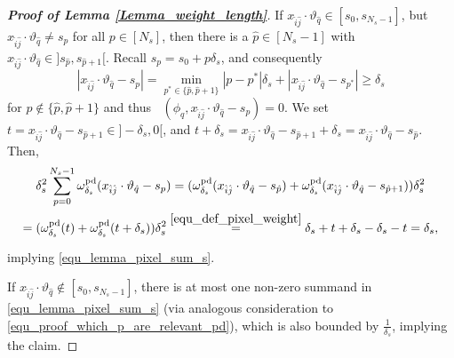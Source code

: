 \documentclass[10pt,a4paper]{amsart}
\DeclareMathOperator{\PixelWeight}{\omega^\mathrm{pd}_{\delta_\mathit{s}}}
\newcommand{\sums}{\sum_{p=0}^{N_s-1}}
\begin{document}
\begin{proof}[\textbf{Proof of Lemma \ref{Lemma_weight_length}}]
If $x_{\hat i \hat j}\cdot\vartheta_{\hat q}\in [s_0,s_{N_s-1}]$, but $x_{\hat i \hat j}\cdot\vartheta_{\hat q}\neq s_p$ for all $p\in [N_s]$, then there is a $\hat p\in [N_s-1]$ with $x_{\hat i \hat j}\cdot\vartheta_{\hat q}\in ]s_{\hat p},s_{\hat p+1}[$. Recall $s_p=s_0+p \delta_s$, and consequently 
\begin{equation} \label{equ_proof_which_p_are_relevant_pd}
|x_{\hat i \hat j}\cdot\vartheta_{\hat q}-s_p|= \min_{p^* \in \{\hat p,\hat p +1\}} |p-p^*|\delta_s+|x_{\hat i \hat j}\cdot\vartheta_{\hat q}-s_{p^*}|\geq \delta_s
\end{equation}
for $p\not \in \{\hat p,\hat p+1\}$ and thus $\PixelWeight(\phi_q,x_{\hat i \hat j}\cdot \vartheta_{\hat q}-s_p)=0$. 
We set $t = x_{\hat i \hat j}\cdot \vartheta_{\hat q}-s_{\hat p+1} \in ]-\delta_s,0[$, and $t+\delta_s = x_{\hat i \hat j}\cdot \vartheta_{\hat q}-s_{\hat p+1} +\delta_s= x_{\hat i \hat j}\cdot \vartheta_{\hat q}-s_{\hat p}$. 
Then, 
\begin{multline}
 \delta_s^2 \sums \PixelWeight(x_{\hat i \hat j}\cdot \vartheta_{\hat q} -s_p)=(\PixelWeight(x_{\hat i \hat j}\cdot \vartheta_{\hat q} -s_{\hat p})+\PixelWeight(x_{\hat i \hat j}\cdot \vartheta_{\hat q} -s_{\hat p+1}))\delta_s^2
\\
 = (\PixelWeight(t)+\PixelWeight(t+\delta_s))\delta_s^2 \underset{\text{}}{\overset{\eqref{equ_def_pixel_weight}}{=}} \delta_s +t + \delta_s - \delta_s-t = \delta_s,
\end{multline} implying \eqref{equ_lemma_pixel_sum_s}.

If $x_{\hat i \hat j}\cdot\vartheta_{\hat q} \not \in [s_0,s_{N_s-1}]$, there is at most one non-zero summand in \eqref{equ_lemma_pixel_sum_s} (via analogous consideration to \eqref{equ_proof_which_p_are_relevant_pd}), which is also bounded by $\frac{1}{\delta_s}$, implying the claim.
\end{proof}
\end{document}
